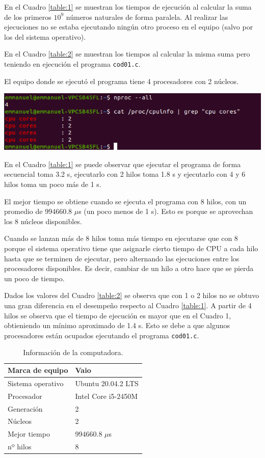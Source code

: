 \documentclass{article}
\begin{document}
En el Cuadro \ref{table:1} se muestran los tiempos de ejecución al calcular la suma de los primeros $10^9$ números naturales de forma paralela. Al realizar las ejecuciones no se estaba ejecutando ningún otro proceso en el equipo (salvo por los del sistema operativo).

En el Cuadro \ref{table:2} se muestran los tiempos al calcular la misma suma pero teniendo en ejecución el programa \texttt{cod01.c}.

El equipo donde se ejecutó el programa tiene 4 procesadores con 2 núcleos.

\includegraphics[width=\linewidth]{cores.png}

\vspace{5mm}

En el Cuadro \ref{table:1} se puede observar que ejecutar el programa de forma secuencial toma 3.2 s, ejecutarlo con 2 hilos toma 1.8 s y ejecutarlo con 4 y 6 hilos toma un poco más de 1 s.

El mejor tiempo se obtiene cuando se ejecuta el programa con 8 hilos, con un promedio de 994660.8 $\mu$s (un poco menos de 1 s). Esto es porque se aprovechan los 8 núcleos disponibles.

Cuando se lanzan más de 8 hilos toma más tiempo en ejecutarse que con 8 porque el sistema operativo tiene que asignarle cierto tiempo de CPU a cada hilo hasta que se terminen de ejecutar, pero alternando las ejecuciones entre los procesadores disponibles. Es decir, cambiar de un hilo a otro hace que se pierda un poco de tiempo.

Dados los valores del Cuadro \ref{table:2} se observa que con 1 o 2 hilos no se obtuvo una gran diferencia en el desempeño respecto al Cuadro \ref{table:1}. A partir de 4 hilos se observa que el tiempo de ejecución es mayor que en el Cuadro 1, obtieniendo un mínimo aproximado de 1.4 s. Esto se debe a que algunos procesadores están ocupados ejecutando el programa \texttt{cod01.c}.

\begin{table}
\begin{center}
\begin{tabular}{|l|l|}
\hline
Marca de equipo & Vaio \\ \hline
Sistema operativo & Ubuntu 20.04.2 LTS \\ \hline
Procesador & Intel Core i5-2450M \\ \hline
Generación & 2 \\ \hline
Núcleos & 2 \\ \hline
Mejor tiempo & 994660.8 $\mu$s \\ \hline
nº hilos & 8 \\ \hline
\end{tabular}
\caption{Información de la computadora.}
\end{center}
\end{table}
\end{document}
